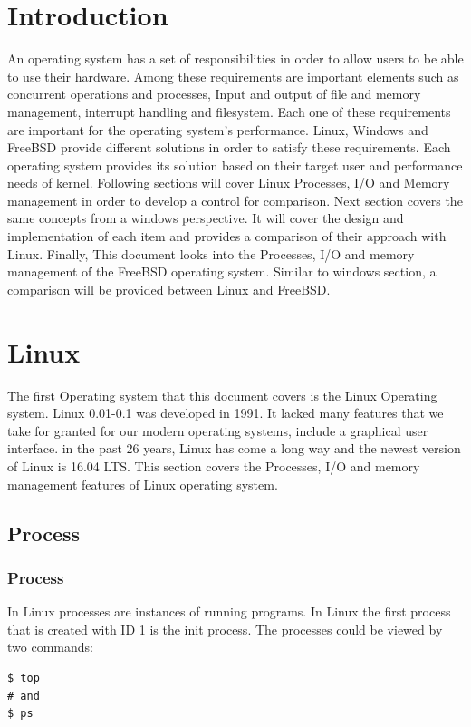 \documentclass[journal,10pt,onecolumn,compsoc,letterpaper,draftclsnofoot,table,xcdraw]{IEEEtran} \usepackage[margin=0.75in]{geometry}
\begin{document}
\section{Introduction}
\noindent An operating system has a set of responsibilities in order to allow users to be able to use their hardware. Among these requirements are important elements such as concurrent operations and processes, Input and output of file and memory management, interrupt handling and filesystem. Each one of these requirements are important for the operating system's performance. Linux, Windows and FreeBSD provide different solutions in order to satisfy these requirements. Each operating system provides its solution based on their target user and performance needs of kernel. Following sections will cover Linux Processes, I/O and Memory management in order to develop a control for comparison. Next section covers the same concepts from a windows perspective. It will cover the design and implementation of each item and provides a comparison of their approach with Linux. Finally, This document looks into the Processes, I/O and memory management of the FreeBSD operating system. Similar to windows section, a comparison will be provided between Linux and FreeBSD.
\section{Linux}
\noindent The first Operating system that this document covers is the Linux Operating system. Linux 0.01-0.1 was developed in 1991. It lacked many features that we take for granted for our modern operating systems, include a graphical user interface. in the past 26 years, Linux has come a long way and the newest version of Linux is 16.04 LTS. This section covers the Processes, I/O and memory management features of Linux operating system. 
\subsection{Process}
\subsubsection{Process}
\noindent In Linux processes are instances of running programs. In Linux the first process that is created with ID 1 is the init process. The processes could be viewed by two commands:
\begin{verbatim}
$ top
# and
$ ps
\end{verbatim}
\end{document}
